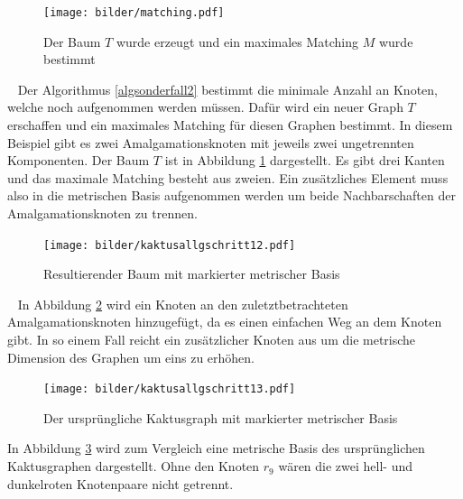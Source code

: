 \begin{bsp}
  	   	 \begin{figure}[h!]
		\centering
 		 \texttt{[image: bilder/matching.pdf]}
   \caption{Der Baum $T$ wurde erzeugt und ein maximales Matching $M$ wurde bestimmt}
   \label{matching}
  	 \end{figure}
  	 \vspace{-3mm}
  	 ~\linebreak 
Der Algorithmus \ref{algsonderfall2} bestimmt die minimale Anzahl an Knoten, welche noch aufgenommen werden müssen. Dafür wird ein neuer Graph $T$ erschaffen und ein maximales Matching für diesen Graphen bestimmt. In diesem Beispiel gibt es zwei Amalgamationsknoten mit jeweils zwei ungetrennten Komponenten. Der Baum $T$ ist in Abbildung \ref{matching} dargestellt. Es gibt drei Kanten und das maximale Matching besteht aus zweien. Ein zusätzliches Element muss also in die metrischen Basis aufgenommen werden um beide Nachbarschaften der Amalgamationsknoten zu trennen.
\vspace{-1mm}
  	   	 \begin{figure}[h!]
		\centering
 		 \texttt{[image: bilder/kaktusallgschritt12.pdf]}
   \caption{Resultierender Baum mit markierter metrischer Basis}
   \label{kaktus6}
  	 \end{figure}
  	 \vspace{-3mm}
  	 ~\linebreak 
  	 In Abbildung \ref{kaktus6} wird ein Knoten an den zuletztbetrachteten Amalgamationsknoten hinzugefügt, da es einen einfachen Weg an dem Knoten gibt. In so einem Fall reicht ein zusätzlicher Knoten aus um die metrische Dimension des Graphen um eins zu erhöhen.
  	 \vspace{-1mm}
  	 \begin{figure}[h!]
		\centering
 		 \texttt{[image: bilder/kaktusallgschritt13.pdf]}
   \caption{Der ursprüngliche Kaktusgraph mit markierter metrischer Basis}
   \label{kaktus7}
  	 \end{figure}
  	 \end{bsp}
  	 In Abbildung \ref{kaktus7} wird zum Vergleich eine metrische Basis des ursprünglichen Kaktusgraphen dargestellt. Ohne den Knoten $r_9$ wären die zwei hell- und dunkelroten Knotenpaare nicht getrennt.
  	 \clearpage
